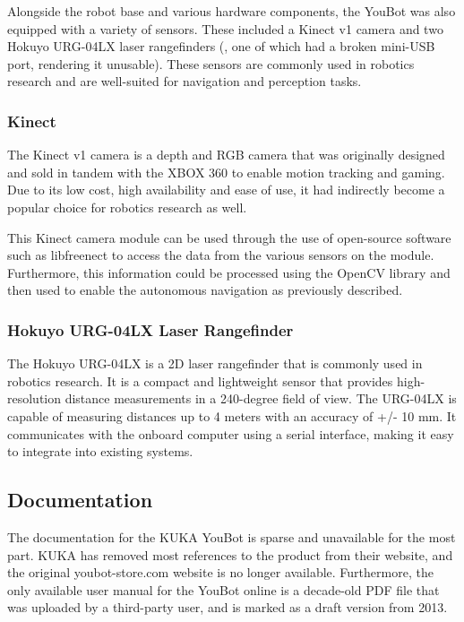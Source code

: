 \documentclass[a4paper, 12pt]{article}
\newif\ifshownotes
\newcommand{\notes}[1]{\ifshownotes\textcolor{blue}{#1}\fi}
\begin{document}
    Alongside the robot base and various hardware components, the YouBot was also equipped with a variety of sensors. These included a Kinect v1 camera and two Hokuyo URG-04LX laser rangefinders (, one of which had a broken mini-USB port, rendering it unusable). These sensors are commonly used in robotics research and are well-suited for navigation and perception tasks.

    \subsubsection{Kinect}  

    The Kinect v1 camera is a depth and RGB camera that was originally designed and sold in tandem with the XBOX 360 to enable motion tracking and gaming. Due to its low cost, high availability and ease of use, it had indirectly become a popular choice for robotics research as well.

    This Kinect camera module can be used through the use of open-source software such as libfreenect \notes{[cite]} to access the data from the various sensors on the module. Furthermore, this information could be processed using the OpenCV library and then used to enable the autonomous navigation as previously described. 

    \subsubsection{Hokuyo URG-04LX Laser Rangefinder}

    The Hokuyo URG-04LX is a 2D laser rangefinder that is commonly used in robotics research. It is a compact and lightweight sensor that provides high-resolution distance measurements in a 240-degree field of view. The URG-04LX is capable of measuring distances up to 4 meters with an accuracy of +/- 10 mm. It communicates with the onboard computer using a serial interface, making it easy to integrate into existing systems. 

    \subsection{Documentation}

    The documentation for the KUKA YouBot is sparse and unavailable for the most part. KUKA has removed most references to the product from their website, and the original youbot-store.com website is no longer available. Furthermore, the only available user manual for the YouBot online is a decade-old PDF file that was uploaded by a third-party user, and is marked as a draft version from 2013. 
\end{document}
